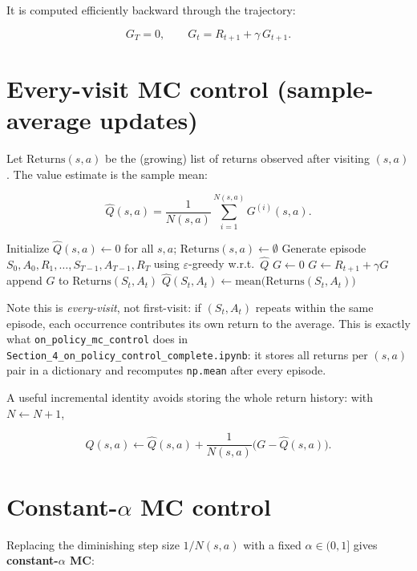\documentclass[11pt]{article}
\begin{document}
It is computed efficiently backward through the trajectory:

\[
    G_T = 0, \qquad G_t = R_{t+1} + \gamma\, G_{t+1}.
\]

\section{Every-visit MC control (sample-average updates)}

Let $\text{Returns}(s,a)$ be the (growing) list of returns observed after
visiting $(s,a)$. The value estimate is the sample mean:

\[
    \hat{Q}(s,a) = \frac{1}{N(s,a)} \sum_{i=1}^{N(s,a)} G^{(i)}(s,a).
\]

\begin{algorithm}[h]
\caption{On-policy every-visit MC control ($\varepsilon$-greedy, sample average)}
\begin{algorithmic}[1]
\State Initialize $\hat{Q}(s,a) \leftarrow 0$ for all $s,a$; $\text{Returns}(s,a) \leftarrow \emptyset$
    \State Generate episode $S_0, A_0, R_1, \dots, S_{T-1}, A_{T-1}, R_T$ using $\varepsilon$-greedy w.r.t.\ $\hat{Q}$
    \State $G \leftarrow 0$
        \State $G \leftarrow R_{t+1} + \gamma G$
        \State append $G$ to $\text{Returns}(S_t, A_t)$
        \State $\hat{Q}(S_t, A_t) \leftarrow \text{mean}\big(\text{Returns}(S_t, A_t)\big)$
    \EndFor
\EndFor
\end{algorithmic}
\end{algorithm}

Note this is \emph{every-visit}, not first-visit: if $(S_t, A_t)$ repeats
within the same episode, each occurrence contributes its own return to the
average. This is exactly what \texttt{on\_policy\_mc\_control} does in
\texttt{Section\_4\_on\_policy\_control\_complete.ipynb}: it stores all
returns per $(s,a)$ pair in a dictionary and recomputes \texttt{np.mean}
after every episode.

A useful incremental identity avoids storing the whole return history: with
$N \leftarrow N+1$,

\[
    \hat{Q}(s,a) \leftarrow \hat{Q}(s,a) + \frac{1}{N(s,a)} \Big( G - \hat{Q}(s,a) \Big).
\]

\section{Constant-$\alpha$ MC control}

Replacing the diminishing step size $1/N(s,a)$ with a fixed
$\alpha \in (0,1]$ gives \textbf{constant-$\alpha$ MC}:
\end{document}
